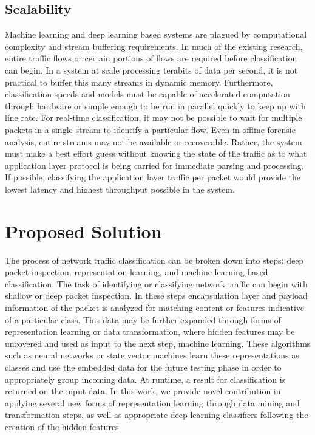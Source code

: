 \subsection{Scalability}

Machine learning and deep learning based systems are plagued by computational complexity and stream buffering requirements. In much of the existing research, entire traffic flows or certain portions of flows are required before classification can begin. In a system at scale processing terabits of data per second, it is not practical to buffer this many streams in dynamic memory. Furthermore, classification speeds and models must be capable of accelerated computation through hardware or simple enough to be run in parallel quickly to keep up with line rate. For real-time classification, it may not be possible to wait for multiple packets in a single stream to identify a particular flow. Even in offline forensic analysis, entire streams may not be available or recoverable. Rather, the system must make a best effort guess without knowing the state of the traffic as to what application layer protocol is being carried for immediate parsing and processing. If possible, classifying the application layer traffic per packet would provide the lowest latency and highest throughput possible in the system.

\section{Proposed Solution}

The process of network traffic classification can be broken down into steps: deep packet inspection, representation learning, and machine learning-based classification. The task of identifying or classifying network traffic can begin with shallow or deep packet inspection. In these steps encapsulation layer and payload information of the packet is analyzed for matching content or features indicative of a particular class. This data may be further expanded through forms of representation learning or data transformation, where hidden features may be uncovered and used as input to the next step, machine learning. These algorithms such as neural networks or state vector machines learn these representations as classes and use the embedded data for the future testing phase in order to appropriately group incoming data. At runtime, a result for classification is returned on the input data. In this work, we provide novel contribution in applying several new forms of representation learning through data mining and transformation steps, as  well as appropriate deep learning classifiers following the creation of the hidden features.

